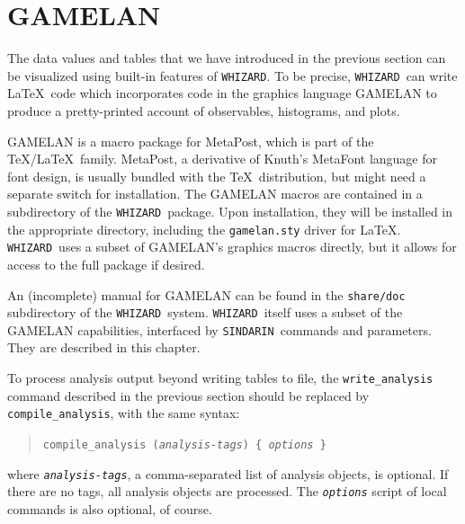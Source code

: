 \documentclass[12pt]{book}
\newcommand{\ttt}[1]{\texttt{#1}}
\newcommand{\whizard}{\texttt{WHIZARD}}
\newcommand{\sindarin}{\texttt{SINDARIN}}
\begin{document}
\section{GAMELAN}

The data values and tables that we have introduced in the previous section can
be visualized using built-in features of \whizard.  To be precise,
\whizard\ can write \LaTeX\ code which incorporates code in the graphics
language GAMELAN to produce a pretty-printed account of observables,
histograms, and plots.  

GAMELAN is a macro package for MetaPost, which is part of the
\TeX/\LaTeX\ family.  MetaPost, a derivative of Knuth's MetaFont language for
font design, is usually bundled with the \TeX\ distribution, but might need a
separate switch for installation.  The GAMELAN macros are contained in a
subdirectory of the \whizard\ package.  Upon installation, they will be
installed in the appropriate directory, including the \ttt{gamelan.sty} driver
for \LaTeX.  \whizard\ uses a subset of GAMELAN's graphics macros
directly, but it allows for access to the full package if desired.

An (incomplete) manual for GAMELAN can be found in the \ttt{share/doc}
subdirectory of the \whizard\ system.  \whizard\ itself uses a subset of the
GAMELAN capabilities, interfaced by \sindarin\ commands and parameters.  They
are described in this chapter.

To process analysis output beyond writing tables to file, the
\ttt{write\_analysis} command described in the previous section should be
replaced by \ttt{compile\_analysis}, with the same syntax:
\begin{quote}
  \begin{footnotesize}
    \ttt{compile\_analysis (\emph{analysis-tags}) \{ \ttt{\emph{options}} \}}
  \end{footnotesize}
\end{quote}
where \ttt{\emph{analysis-tags}}, a comma-separated list of analysis objects,
is optional.  If there are no tags, all analysis objects are processed.  The
\ttt{\emph{options}} script of local commands is also optional, of course.
\end{document}

